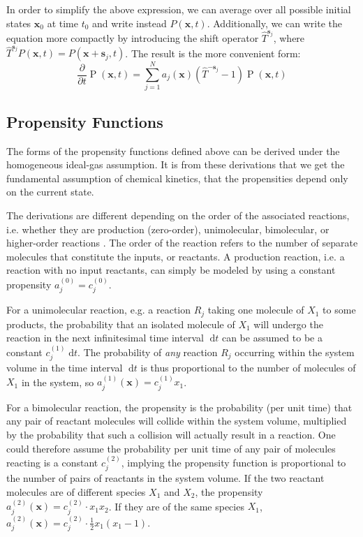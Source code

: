 \documentclass[english,letterpaper,12pt]{report}
\newcommand{\dee}{\;\mathrm{d}}
\renewcommand{\vec}[1]{\ensuremath{\mathbf{#1}}}
\DeclareMathOperator{\Prob}{P}
\begin{document}
\begin{doublespacing}
In order to simplify the above expression, we can average over all possible initial states $\vec{x}_0$ at time $t_0$ and write instead $P(\vec{x}, t)$. Additionally, we can write the equation more compactly by introducing the shift operator $\hat{T}^{\vec{s}_j}$, where $\hat{T}^{\vec{s}_j} P(\vec{x}, t) = P(\vec{x} + \vec{s}_j, t)$. The result is the more convenient form:
\begin{equation}
    \frac{\partial}{\partial t} \Prob(\vec{x}, t) = \sum_{j=1}^N a_j(\vec{x})(\hat{T}^{-\vec{s}_j} - 1)\Prob(\vec{x}, t)
    \label{eq:master-eqn}
\end{equation}

\subsection{Propensity Functions} %
\label{sub:propensities}

The forms of the propensity functions defined above can be derived under the homogeneous ideal-gas assumption. It is from these derivations that we get the fundamental assumption of chemical kinetics, that the propensities depend only on the current state.

The derivations are different depending on the order of the associated reactions, i.e. whether they are production (zero-order), unimolecular, bimolecular, or higher-order reactions \cite{gillespie-ssa}. The order of the reaction refers to the number of separate molecules that constitute the inputs, or reactants. A production reaction, i.e. a reaction with no input reactants, can simply be modeled by using a constant propensity $a_j^{(0)} = c_j^{(0)}$. 

For a unimolecular reaction, e.g. a reaction $R_j$ taking one molecule of $X_1$ to some products, the probability that an isolated molecule of $X_1$ will undergo the reaction in the next infinitesimal time interval $\dee t$ can be assumed to be a constant $c_j^{(1)} \dee t$. The probability of \emph{any} reaction $R_j$ occurring within the system volume in the time interval $\dee t$ is thus proportional to the number of molecules of $X_1$ in the system, so $a_j^{(1)}(\vec{x}) = c_j^{(1)} x_1$.

For a bimolecular reaction, the propensity is the probability (per unit time) that any pair of reactant molecules will collide within the system volume, multiplied by the probability that such a collision will actually result in a reaction. One could therefore assume the probability per unit time of any pair of molecules reacting is a constant $c_j^{(2)}$, implying the propensity function is proportional to the number of pairs of reactants in the system volume. If the two reactant molecules are of different species $X_1$ and $X_2$, the propensity $a_j^{(2)}(\vec{x}) = c_j^{(2)} \cdot x_1 x_2$. If they are of the same species $X_1$, $a_j^{(2)}(\vec{x}) = c_j^{(2)} \cdot \frac{1}{2}x_1(x_1 - 1)$.


\end{doublespacing}
\end{document}
